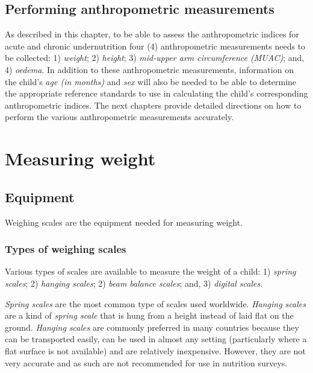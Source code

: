 \documentclass[12pt,]{book}
\theoremstyle{definition}
\theoremstyle{definition}
\theoremstyle{definition}
\theoremstyle{remark}
\begin{document}
\hypertarget{performing-anthropometric-measurements}{%
\section{Performing anthropometric
measurements}\label{performing-anthropometric-measurements}}

As described in this chapter, to be able to assess the anthropometric
indices for acute and chronic undernutrition four (4) anthropometric
measurements needs to be collected: 1) \emph{weight}; 2) \emph{height};
3) \emph{mid-upper arm circumference (MUAC)}; and, 4) \emph{oedema}. In
addition to these anthropometric measurements, information on the
child's \emph{age (in months)} and \emph{sex} will also be needed to be
able to determine the appropriate reference standards to use in
calculating the child's corresponding anthropometric indices. The next
chapters provide detailed directions on how to perform the various
anthropometric measurements accurately.

\hypertarget{weight}{%
\chapter{Measuring weight}\label{weight}}

\hypertarget{equipment}{%
\section{Equipment}\label{equipment}}

Weighing scales are the equipment needed for measuring weight.

\hypertarget{types-of-weighing-scales}{%
\subsection{Types of weighing scales}\label{types-of-weighing-scales}}

Various types of scales are available to measure the weight of a child:
1) \emph{spring scales}; 2) \emph{hanging scales}; 2) \emph{beam balance
scales}; and, 3) \emph{digital scales}.

\emph{Spring scales} are the most common type of scales used worldwide.
\emph{Hanging scales} are a kind of \emph{spring scale} that is hung
from a height instead of laid flat on the ground. \emph{Hanging scales}
are commonly preferred in many countries because they can be transported
easily, can be used in almost any setting (particularly where a flat
surface is not available) and are relatively inexpensive. However, they
are not very accurate and as such are not recommended for use in
nutrition surveys.
\end{document}
